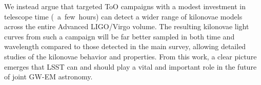 We instead argue that targeted ToO campaigns with a modest investment in telescope time (\apx~a~few~hours) can detect a wider range of kilonovae models across the entire Advanced LIGO/Virgo volume. The resulting kilonovae light curves from such a campaign will be far better sampled in both time and wavelength compared to those detected in the main survey, allowing detailed studies of the kilonovae behavior and properties. From this work, a clear picture emerges that LSST can and should play a vital and important role in the future of joint GW-EM astronomy. 